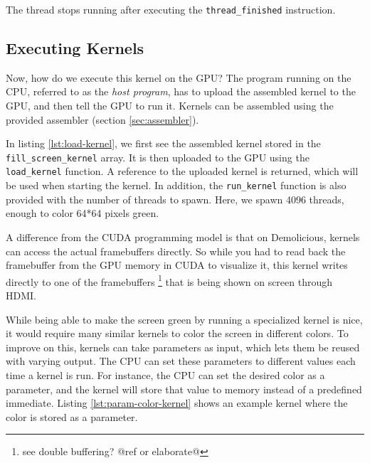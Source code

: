 \documentclass[../main/report.tex]{subfiles}
\begin{document}
The thread stops running after executing the \verb/thread_finished/ instruction.

\subsection{Executing Kernels}

Now, how do we execute this kernel on the GPU?
The program running on the CPU, referred to as the \emph{host program},
has to upload the assembled kernel to the GPU, and then tell the GPU to run it.
Kernels can be assembled using the provided assembler (section \ref{sec:assembler}).


In listing \ref{lst:load-kernel}, we first see the assembled kernel stored in the
\verb/fill_screen_kernel/ array.
It is then uploaded to the GPU using the \verb/load_kernel/ function.
A reference to the uploaded kernel is returned, which will be used when starting the kernel.
In addition, the \verb/run_kernel/ function is also provided with the number of threads to spawn.
Here, we spawn 4096 threads, enough to color 64*64 pixels green.

A difference from the CUDA programming model is that on Demolicious, kernels can access the actual framebuffers directly.
So while you had to read back the framebuffer from the GPU memory in CUDA to visualize it,
this kernel writes directly to one of the framebuffers \footnote{see double buffering? @ref or elaborate@} that is being shown on screen through HDMI.

While being able to make the screen green by running a specialized kernel is nice,
it would require many similar kernels to color the screen in different colors.
To improve on this, kernels can take parameters as input,
which lets them be reused with varying output.
The CPU can set these parameters to different values each time a kernel is run.
For instance, the CPU can set the desired color as a parameter,
and the kernel will store that value to memory instead of a predefined immediate.
Listing \ref{lst:param-color-kernel} shows an example kernel where the color is stored as a parameter.
\end{document}
